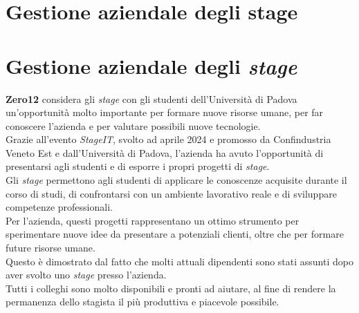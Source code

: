 \section{Gestione aziendale degli stage}
\label{sez:gestione-aziendale-stage}

\section{Gestione aziendale degli \textit{stage}}  
\label{sez:gestione-aziendale-stage}  

\textbf{Zero12} considera gli \textit{stage} con gli studenti dell'Università di Padova un'opportunità molto importante per formare nuove risorse umane,
per far conoscere l'azienda e per valutare possibili nuove tecnologie.\\  
Grazie all'evento \textit{StageIT}, svolto ad aprile 2024 e promosso da Confindustria Veneto Est e dall'Università di Padova, 
l'azienda ha avuto l'opportunità di presentarsi agli studenti e di esporre i propri progetti di \textit{stage}.\\  

\noindent Gli \textit{stage} permettono agli studenti di applicare le conoscenze acquisite durante il corso di studi, 
di confrontarsi con un ambiente lavorativo reale e di sviluppare competenze professionali.\\  
Per l'azienda, questi progetti rappresentano un ottimo strumento per sperimentare nuove idee da presentare a potenziali clienti, 
oltre che per formare future risorse umane.\\  
Questo è dimostrato dal fatto che molti attuali dipendenti sono stati assunti dopo aver svolto uno \textit{stage} presso l'azienda.\\  
Tutti i colleghi sono molto disponibili e pronti ad aiutare, al fine di rendere la permanenza dello stagista il più produttiva e piacevole possibile.\\  
